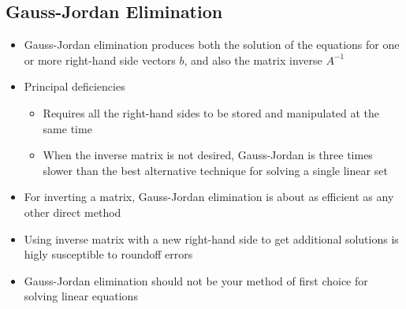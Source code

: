 \documentclass[a4wide,10pt]{article}
\begin{document}
\subsection{Gauss-Jordan Elimination} %
\label{sub:gauss_jordan_elimination}
\begin{itemize}
	\item Gauss-Jordan elimination produces both the solution of the equations for one or more right-hand side vectors $b$, and also the matrix inverse $A^{-1}$
	\item Principal deficiencies
	\begin{itemize}
		\item Requires all the right-hand sides to be stored and manipulated at the same time
		\item When the inverse matrix is not desired, Gauss-Jordan is three times slower than the best alternative technique for solving a single linear set
	\end{itemize}
	\item For inverting a matrix, Gauss-Jordan elimination is about as efficient as any other direct method
	\item Using inverse matrix with a new right-hand side to get additional solutions is higly susceptible to roundoff errors
	\item Gauss-Jordan elimination should not be your method of first choice for solving linear equations
\end{itemize}
\end{document}

